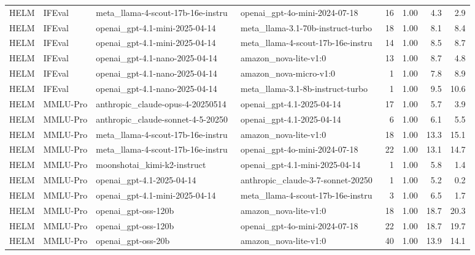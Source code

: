 \begin{longtable}{lp{2.4cm}p{3.5cm}p{3.5cm}rrrr}
HELM & IFEval & meta\_\allowbreak llama-4-scout-17b-16e-instru~ & openai\_\allowbreak gpt-4o-mini-2024-07-18 & 16 & 1.00 & 4.3 & 2.9 \\
HELM & IFEval & openai\_\allowbreak gpt-4.1-mini-2025-04-14 & meta\_\allowbreak llama-3.1-70b-instruct-turbo & 18 & 1.00 & 8.1 & 8.4 \\
HELM & IFEval & openai\_\allowbreak gpt-4.1-mini-2025-04-14 & meta\_\allowbreak llama-4-scout-17b-16e-instru~ & 14 & 1.00 & 8.5 & 8.7 \\
HELM & IFEval & openai\_\allowbreak gpt-4.1-nano-2025-04-14 & amazon\_\allowbreak nova-lite-v1:0 & 13 & 1.00 & 8.7 & 4.8 \\
HELM & IFEval & openai\_\allowbreak gpt-4.1-nano-2025-04-14 & amazon\_\allowbreak nova-micro-v1:0 & 1 & 1.00 & 7.8 & 8.9 \\
HELM & IFEval & openai\_\allowbreak gpt-4.1-nano-2025-04-14 & meta\_\allowbreak llama-3.1-8b-instruct-turbo & 1 & 1.00 & 9.5 & 10.6 \\
HELM & MMLU-Pro & anthropic\_\allowbreak claude-opus-4-20250514 & openai\_\allowbreak gpt-4.1-2025-04-14 & 17 & 1.00 & 5.7 & 3.9 \\
HELM & MMLU-Pro & anthropic\_\allowbreak claude-sonnet-4-5-20250~ & openai\_\allowbreak gpt-4.1-2025-04-14 & 6 & 1.00 & 6.1 & 5.5 \\
HELM & MMLU-Pro & meta\_\allowbreak llama-4-scout-17b-16e-instru~ & amazon\_\allowbreak nova-lite-v1:0 & 18 & 1.00 & 13.3 & 15.1 \\
HELM & MMLU-Pro & meta\_\allowbreak llama-4-scout-17b-16e-instru~ & openai\_\allowbreak gpt-4o-mini-2024-07-18 & 22 & 1.00 & 13.1 & 14.7 \\
HELM & MMLU-Pro & moonshotai\_\allowbreak kimi-k2-instruct & openai\_\allowbreak gpt-4.1-mini-2025-04-14 & 1 & 1.00 & 5.8 & 1.4 \\
HELM & MMLU-Pro & openai\_\allowbreak gpt-4.1-2025-04-14 & anthropic\_\allowbreak claude-3-7-sonnet-20250~ & 1 & 1.00 & 5.2 & 0.2 \\
HELM & MMLU-Pro & openai\_\allowbreak gpt-4.1-mini-2025-04-14 & meta\_\allowbreak llama-4-scout-17b-16e-instru~ & 3 & 1.00 & 6.5 & 1.7 \\
HELM & MMLU-Pro & openai\_\allowbreak gpt-oss-120b & amazon\_\allowbreak nova-lite-v1:0 & 18 & 1.00 & 18.7 & 20.3 \\
HELM & MMLU-Pro & openai\_\allowbreak gpt-oss-120b & openai\_\allowbreak gpt-4o-mini-2024-07-18 & 22 & 1.00 & 18.7 & 19.7 \\
HELM & MMLU-Pro & openai\_\allowbreak gpt-oss-20b & amazon\_\allowbreak nova-lite-v1:0 & 40 & 1.00 & 13.9 & 14.1 \\

\end{longtable}
